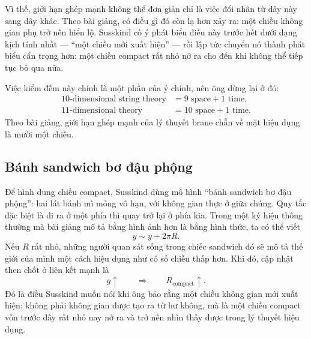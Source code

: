 Vì thế, giới hạn ghép mạnh không thể đơn giản chỉ là việc đổi nhãn từ dây này sang dây khác. Theo bài giảng, có điều gì đó còn lạ hơn xảy ra: một chiều không gian phụ trở nên hiển lộ. Susskind cố ý phát biểu điều này trước hết dưới dạng kịch tính nhất --- ``một chiều mới xuất hiện'' --- rồi lập tức chuyển nó thành phát biểu cẩn trọng hơn: một chiều compact rất nhỏ nở ra cho đến khi không thể tiếp tục bỏ qua nữa.

Việc kiểm đếm này chính là một phần của ý chính, nên ông dừng lại ở đó:
\begin{equation}
\begin{aligned}
10\text{-dimensional string theory} &= 9\text{ space}+1\text{ time},\\
11\text{-dimensional theory} &= 10\text{ space}+1\text{ time}.
\end{aligned}
\end{equation}
Theo bài giảng, giới hạn ghép mạnh của lý thuyết brane chẵn về mặt hiệu dụng là mười một chiều.


\subsection{Bánh sandwich bơ đậu phộng}

Để hình dung chiều compact, Susskind dùng mô hình ``bánh sandwich bơ đậu phộng'': hai lát bánh mì mỏng vô hạn, với không gian thực ở giữa chúng. Quy tắc đặc biệt là đi ra ở một phía thì quay trở lại ở phía kia. Trong một ký hiệu thông thường mà bài giảng mô tả bằng hình ảnh hơn là bằng hình thức, ta có thể viết
\begin{equation}
y \sim y + 2\pi R.
\end{equation}
Nếu \(R\) rất nhỏ, những người quan sát sống trong chiếc sandwich đó sẽ mô tả thế giới của mình một cách hiệu dụng như có số chiều thấp hơn. Khi đó, cập nhật then chốt ở liên kết mạnh là
\begin{equation}
g\uparrow
\qquad \Longrightarrow \qquad
R_{\mathrm{compact}}\uparrow.
\end{equation}
Đó là điều Susskind muốn nói khi ông bảo rằng một chiều không gian mới xuất hiện: không phải không gian được tạo ra từ hư không, mà là một chiều compact vốn trước đây rất nhỏ nay nở ra và trở nên nhìn thấy được trong lý thuyết hiệu dụng.

